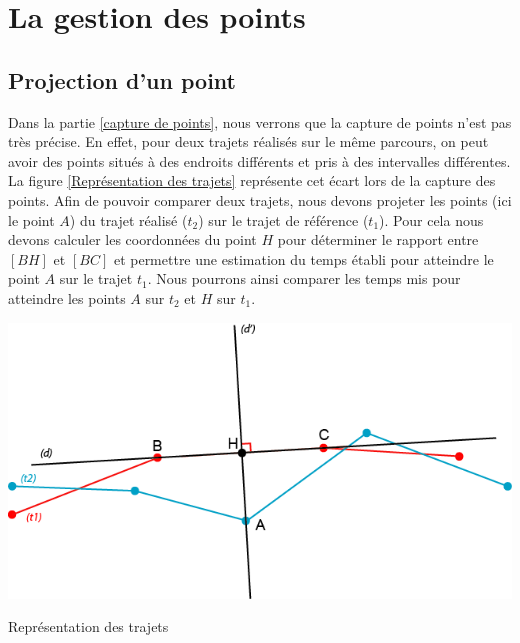 \chapter{La gestion des points}

\section{Projection d'un point}
Dans la partie \ref{capture de points}, nous verrons que la capture de points n'est pas très précise. En effet, pour deux trajets réalisés sur le même parcours, on peut avoir des points situés à des endroits différents et pris à des intervalles différentes. La figure \ref{Représentation des trajets} représente cet écart lors de la capture des points. Afin de pouvoir comparer deux trajets, nous devons projeter les points (ici le point $A$) du trajet réalisé ($t_2$) sur le trajet de référence ($t_1$). Pour cela nous devons calculer les coordonnées du point $H$ pour déterminer le rapport entre $[BH]$ et $[BC]$ et permettre une estimation du temps établi pour atteindre le point $A$ sur le trajet $t_1$. Nous pourrons ainsi comparer les temps mis pour atteindre les points $A$ sur $t_2$ et $H$ sur $t_1$.

\begin{img}  
	\includegraphics[scale=1]{img/Trajet.png}
	\caption{Représentation des trajets}
	\label{Représentation des trajets}
\end{img}

